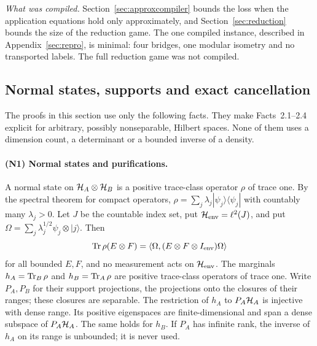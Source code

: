 \emph{What was compiled.} Section~\ref{sec:approxcompiler} bounds the loss when the application equations hold only approximately, and Section~\ref{sec:reduction} bounds the size of the reduction game. The one compiled instance, described in Appendix~\ref{sec:repro}, is minimal: four bridges, one modular isometry and no transported labels. The full reduction game was not compiled.

\subsection*{Normal states, supports and exact cancellation}
The proofs in this section use only the following facts. They make Facts~2.1--2.4 explicit for arbitrary, possibly nonseparable, Hilbert spaces. None of them uses a dimension count, a determinant or a bounded inverse of a density.

\paragraph{(N1) Normal states and purifications.}
A normal state on $\mathcal H_A\otimes\mathcal H_B$ is a positive trace-class operator $\rho$ of trace one. By the spectral theorem for compact operators, $\rho=\sum_j\lambda_j|\psi_j\rangle\langle\psi_j|$ with countably many $\lambda_j>0$. Let $J$ be the countable index set, put $\mathcal H_{\rm env}=\ell^2(J)$, and put $\Omega=\sum_j\lambda_j^{1/2}\psi_j\otimes|j\rangle$. Then
\[
 \operatorname{Tr}\rho(E\otimes F)=\langle\Omega,(E\otimes F\otimes I_{\rm env})\Omega\rangle
\]
for all bounded $E,F$, and no measurement acts on $\mathcal H_{\rm env}$. The marginals $h_A=\operatorname{Tr}_B\rho$ and $h_B=\operatorname{Tr}_A\rho$ are positive trace-class operators of trace one. Write $P_A,P_B$ for their support projections, the projections onto the closures of their ranges; these closures are separable. The restriction of $h_A$ to $P_A\mathcal H_A$ is injective with dense range. Its positive eigenspaces are finite-dimensional and span a dense subspace of $P_A\mathcal H_A$. The same holds for $h_B$. If $P_A$ has infinite rank, the inverse of $h_A$ on its range is unbounded; it is never used.

